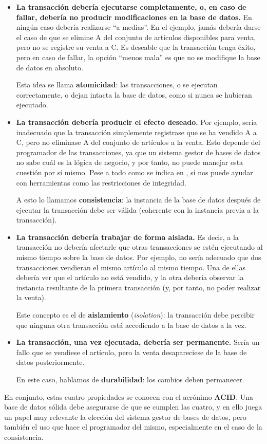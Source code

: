 \documentclass[12pt, a4paper]{article}
\begin{document}
\begin{itemize}
    \item \textbf{La transacción debería ejecutarse completamente, o, en caso de fallar, debería no producir modificaciones en la base de datos.} En ningún caso debería realizarse ``a medias''. En el ejemplo, jamás debería darse el caso de que se elimine A del conjunto de artículos disponibles para venta, pero no se registre su venta a C. Es deseable que la transacción tenga éxito, pero en caso de fallar, la opción ``menos mala'' es que no se modifique la base de datos en absoluto.
    
    Esta idea se llama \textbf{atomicidad}: las transacciones, o se ejecutan correctamente, o dejan intacta la base de datos, como si nunca se hubieran ejecutado.

    \item \textbf{La transacción debería producir el efecto deseado.} Por ejemplo, sería inadecuado que la transacción simplemente registrase que se ha vendido A a C, pero no eliminase A del conjunto de artículos a la venta. Esto depende del programador de las transacciones, ya que un sistema gestor de bases de datos no sabe cuál es la lógica de negocio, y por tanto, no puede manejar esta cuestión por sí mismo. Pese a todo como se indica en \cite{RefWorks:doc:6049e6458f08a1274936fc32}, sí nos puede ayudar con herramientas como las restricciones de integridad.
    
    A esto lo llamamos \textbf{consistencia}: la instancia de la base de datos después de ejecutar la transacción debe ser válida (coherente con la instancia previa a la transacción).

    \item \textbf{La transacción debería trabajar de forma aislada.} Es decir, a la transacción no debería afectarle que otras transacciones se estén ejecutando al mismo tiempo sobre la base de datos. Por ejemplo, no sería adecuado que dos transacciones vendieran el mismo artículo al mismo tiempo. Una de ellas debería ver que el artículo no está vendido, y la otra debería observar la instancia resultante de la primera transacción (y, por tanto, no poder realizar la venta).
    
    Este concepto es el de \textbf{aislamiento} (\textit{isolation}): la transacción debe percibir que ninguna otra transacción está accediendo a la base de datos a la vez.

    \item \textbf{La transacción, una vez ejecutada, debería ser permanente.} Sería un fallo que se vendiese el artículo, pero la venta desapareciese de la base de datos posteriormente.
    
    En este caso, hablamos de \textbf{durabilidad}: los cambios deben permanecer.
\end{itemize}

En conjunto, estas cuatro propiedades se conocen con el acrónimo \textbf{ACID}. Una base de datos sólida debe asegurarse de que se cumplen las cuatro, y en ello juega un papel muy relevante la elección del sistema gestor de bases de datos, pero también el uso que hace el programador del mismo, especialmente en el caso de la consistencia.


\end{document}
